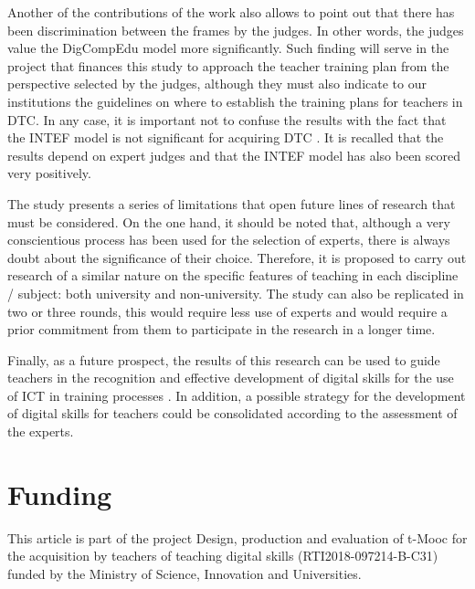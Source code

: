 \documentclass{textolivre}
\begin{document}
Another of the contributions of the work also allows to point out that there
has been discrimination between the frames by the judges. In other words, the
judges value the DigCompEdu model more significantly. Such finding will serve
in the project that finances this study to approach the teacher training plan
from the perspective selected by the judges, although they must also indicate
to our institutions the guidelines on where to establish the training plans for
teachers in DTC. In any case, it is important not to confuse the results with
the fact that the INTEF model is not significant for acquiring DTC \cite{padillaHernandez2019}.
It is recalled that the results depend on
expert judges and that the INTEF model has also been scored very positively.

The study presents a series of limitations that open future lines of research
that must be considered. On the one hand, it should be noted that, although a
very conscientious process has been used for the selection of experts, there is
always doubt about the significance of their choice. Therefore, it is proposed
to carry out research of a similar nature on the specific features of teaching
in each discipline / subject: both university and non-university. The study can
also be replicated in two or three rounds, this would require less use of
experts and would require a prior commitment from them to participate in the
research in a longer time.

Finally, as a future prospect, the results of this research can be used to
guide teachers in the recognition and effective development of digital skills
for the use of ICT in training processes \cite{barraganSanchez2020}.
In addition, a possible strategy for
the development of digital skills for teachers could be consolidated according
to the assessment of the experts.


\section*{Funding}
This article is part of the project Design, production and evaluation of t-Mooc
for the acquisition by teachers of teaching digital skills
(RTI2018-097214-B-C31) funded by the Ministry of Science, Innovation and
Universities.




\printbibliography\label{sec-bib}
\end{document}
